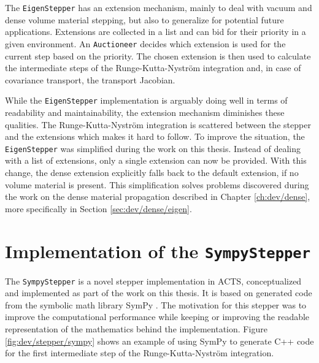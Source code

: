 The \texttt{EigenStepper} has an extension mechanism, mainly to deal with vacuum and dense volume material stepping, but also to generalize for potential future applications. Extensions are collected in a list and can bid for their priority in a given environment. An \texttt{Auctioneer} decides which extension is used for the current step based on the priority. The chosen extension is then used to calculate the intermediate steps of the Runge-Kutta-Nyström integration and, in case of covariance transport, the transport Jacobian.

While the \texttt{EigenStepper} implementation is arguably doing well in terms of readability and maintainability, the extension mechanism diminishes these qualities. The Runge-Kutta-Nyström integration is scattered between the stepper and the extensions which makes it hard to follow. To improve the situation, the \texttt{EigenStepper} was simplified during the work on this thesis. Instead of dealing with a list of extensions, only a single extension can now be provided. With this change, the dense extension explicitly falls back to the default extension, if no volume material is present. This simplification solves problems discovered during the work on the dense material propagation described in Chapter \ref{ch:dev/dense}, more specifically in Section \ref{sec:dev/dense/eigen}.

\section{Implementation of the \texttt{SympyStepper}}
\label{sec:dev/stepper/sympy}

The \texttt{SympyStepper} is a novel stepper implementation in ACTS, conceptualized and implemented as part of the work on this thesis. It is based on generated code from the symbolic math library SymPy \cite{sympy}. The motivation for this stepper was to improve the computational performance while keeping or improving the readable representation of the mathematics behind the implementation. Figure \ref{fig:dev/stepper/sympy} shows an example of using SymPy to generate C++ code for the first intermediate step of the Runge-Kutta-Nyström integration.


